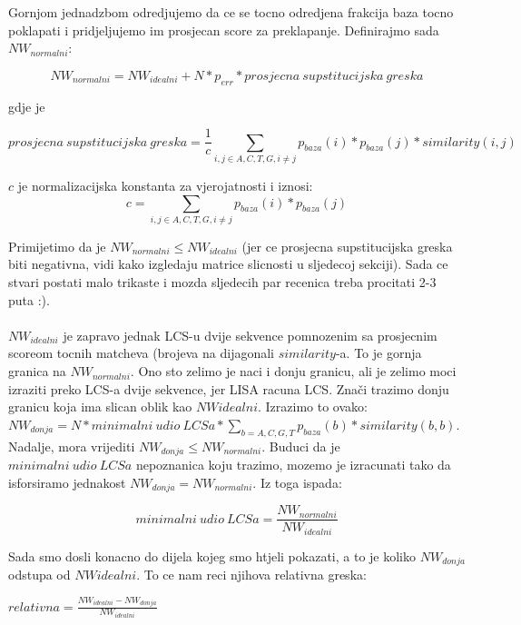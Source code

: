 \documentclass[11pt]{article} %
\begin{document}
Gornjom jednadzbom odredjujemo da ce se tocno odredjena frakcija baza tocno poklapati i pridjeljujemo im prosjecan score za preklapanje. Definirajmo sada $NW_{normalni}$:

\begin{equation}
	NW_{normalni} = NW_{idealni} + N * p_{err} * prosjecna\ supstitucijska\ greska
\end{equation}

gdje je

\begin{equation}
	prosjecna\ supstitucijska\ greska = \frac{1}{c}\sum\limits_{i,j\in{A,C,T,G}, i\neq j} p_{baza}(i)*p_{baza}(j)*similarity(i,j)
\end{equation}

$c$ je normalizacijska konstanta za vjerojatnosti i iznosi:
\begin{equation}
	c = \sum\limits_{i,j\in{A,C,T,G}, i\neq j} p_{baza}(i)*p_{baza}(j)
\end{equation}

Primijetimo da je $NW_{normalni} \le NW_{idealni}$ (jer ce prosjecna supstitucijska greska biti negativna, vidi kako izgledaju matrice slicnosti u sljedecoj sekciji). Sada ce stvari postati malo trikaste i mozda sljedecih par recenica treba procitati 2-3 puta :).\\
\\
$NW_{idealni}$ je zapravo jednak LCS-u dvije sekvence pomnozenim sa prosjecnim scoreom tocnih matcheva (brojeva na dijagonali $similarity$-a. To je gornja granica na $NW_{normalni}$. Ono sto zelimo je naci i donju granicu, ali je zelimo moci izraziti preko LCS-a dvije sekvence, jer LISA racuna LCS. Znači trazimo donju granicu koja ima slican oblik kao $NW{idealni}$. Izrazimo to ovako:
$NW_{donja} = N *minimalni\ udio\ LCSa * \sum\limits_{b=A,C,G,T} p_{baza}(b) * similarity(b,b) $. Nadalje, mora vrijediti $NW_{donja} \le NW_{normalni}$. Buduci da je $minimalni\ udio\ LCSa$ nepoznanica koju trazimo, mozemo je izracunati tako da isforsiramo jednakost $NW_{donja}= NW_{normalni}$. Iz toga ispada:

\begin{equation}
	minimalni\ udio\ LCSa = \frac{NW_{normalni}}{NW_{idealni}}
\end{equation}

Sada smo dosli konacno do dijela kojeg smo htjeli pokazati, a to je koliko $NW_{donja}$ odstupa od $NW{idealni}$. To ce nam reci njihova relativna greska:

$relativna = \frac{NW_{idealni}-NW_{donja}}{NW_{idealni}}$
\end{document}
